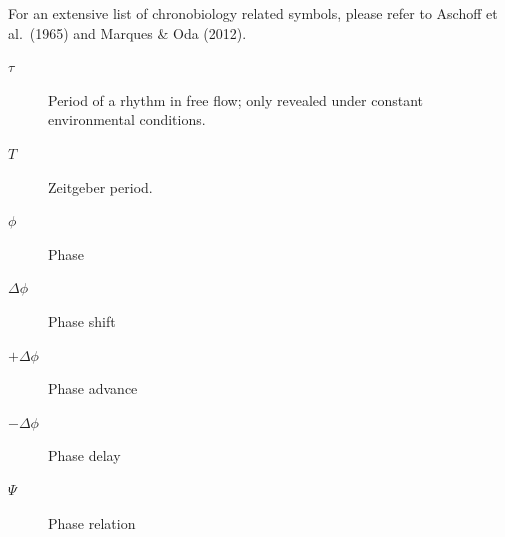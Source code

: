 \documentclass[
  12pt,
  a4paper,
  oneside]{tesesusp}
\begin{document}

\begin{simbolos}
For an extensive list of chronobiology related symbols, please refer to
Aschoff et al.~(1965) and Marques \& Oda (2012).

\begin{description}
\item[\(\tau\)]
\hspace{20cm}

Period of a rhythm in free flow; only revealed under constant
environmental conditions.
\item[\(T\)]
\hspace{20cm}

Zeitgeber period.
\item[\(\phi\)]
\hspace{20cm}

Phase
\item[\(\Delta\phi\)]
\hspace{20cm}

Phase shift
\item[\(+\Delta\phi\)]
\hspace{20cm}

Phase advance
\item[\(-\Delta\phi\)]
\hspace{20cm}

Phase delay
\item[\(\Psi\)]
\hspace{20cm}

Phase relation
\end{description}
\end{simbolos}

\end{document}
